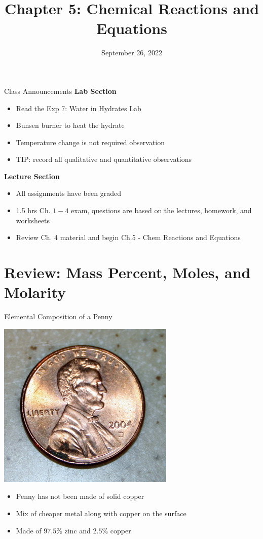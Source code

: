 \documentclass[11pt]{beamer}
\title{Chapter 5: Chemical Reactions and Equations}
\institute{Chemistry Department, Cypress College}
\date{September 26, 2022}
\begin{document}
\begin{frame}
  \titlepage
\end{frame}

\begin{frame}{Class Announcements}
  \textbf{Lab Section}
  \begin{itemize}
  \item Read the Exp 7: Water in Hydrates Lab
  \item Bunsen burner to heat the hydrate
  \item Temperature change is not required observation
  \item TIP: record all qualitative and quantitative observations
  \end{itemize}

  \textbf{Lecture Section}
  \begin{itemize}
  \item All assignments have been graded
  \item 1.5 hrs Ch. $1 - 4$ exam, questions are based on the lectures,
    homework, and worksheets
  \item Review Ch. 4 material and begin Ch.5 - Chem Reactions and Equations
  \end{itemize}
\end{frame}

\section{Review: Mass Percent, Moles, and Molarity}

\begin{frame}{Elemental Composition of a Penny}
  \begin{center}
    \includegraphics[scale=0.3]{penny_2004}
  \end{center}

  \begin{itemize}
  \item Penny has not been made of solid copper
  \item Mix of cheaper metal along with copper on the surface
  \item Made of $97.5\%$ zinc and $2.5\%$ copper
  \end{itemize}
\end{frame}
\end{document}
